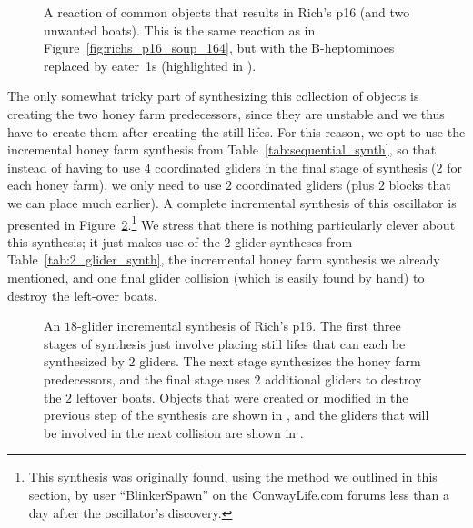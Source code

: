 \begin{figure}[!ht]
	\centering{}
	\caption{A reaction of common objects that results in Rich's p16 (and two unwanted boats). This is the same reaction as in Figure~\ref{fig:richs_p16_soup_164}, but with the B-heptominoes replaced by eater~1s (highlighted in ).}\label{fig:richs_p16_predecessor}
\end{figure}

The only somewhat tricky part of synthesizing this collection of objects is creating the two honey farm predecessors, since they are unstable and we thus have to create them after creating the still lifes. For this reason, we opt to use the incremental honey farm synthesis from Table~\ref{tab:sequential_synth}, so that instead of having to use $4$ coordinated gliders in the final stage of synthesis ($2$ for each honey farm), we only need to use $2$ coordinated gliders (plus $2$ blocks that we can place much earlier). A complete incremental synthesis of this oscillator is presented in Figure~\ref{fig:richs_p16_synthesis}.\footnote{This synthesis was originally found, using the method we outlined in this section, by user ``BlinkerSpawn'' on the ConwayLife.com forums less than a day after the oscillator's discovery.} We stress that there is nothing particularly clever about this synthesis; it just makes use of the $2$-glider syntheses from Table~\ref{tab:2_glider_synth}, the incremental honey farm synthesis we already mentioned, and one final glider collision (which is easily found by hand) to destroy the left-over boats.

\begin{figure}[!ht]
	\centering
	
	\caption{An $18$-glider incremental synthesis of Rich's p16. The first three stages of synthesis just involve placing still lifes that can each be synthesized by $2$ gliders. The next stage synthesizes the honey farm predecessors, and the final stage uses $2$ additional gliders to destroy the $2$ leftover boats. Objects that were created or modified in the previous step of the synthesis are shown in , and the gliders that will be involved in the next collision are shown in .}\label{fig:richs_p16_synthesis}
\end{figure}


